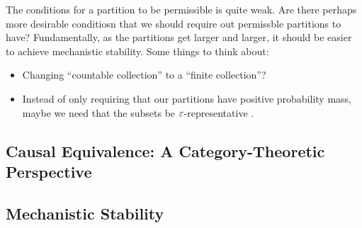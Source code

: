 
\begin{rmk}
The conditions for a partition to be permissible is quite weak. Are there
perhaps more desirable conditiosn that we should require out permissble
partitions to have? Fundamentally, as the partitions get larger and larger,
it should be easier to achieve mechanistic stability. Some things to think
about:
\begin{itemize}
\item Changing ``countable collection'' to a ``finite collection''?
\item Instead of only requiring that our partitions have positive
probability mass, maybe we need that the subsets be $\varepsilon$-representative
\citep{shalev2014understanding}.
\end{itemize}
\end{rmk}

\subsection{Causal Equivalence: A Category-Theoretic Perspective}
\label{s:causal-equiv}


\subsection{Mechanistic Stability}\label{s:mech-stab}



